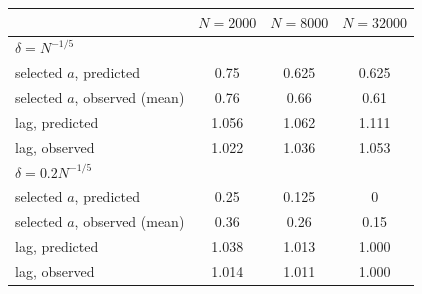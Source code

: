 \begin{tabular}{lccc}
\toprule
 & $N=2000$ & $N=8000$ & $N=32000$ \\
\midrule
\multicolumn{4}{l}{\emph{$\delta=N^{-1/5}$}} \\
selected $a$, predicted & 0.75 & 0.625 & 0.625 \\
selected $a$, observed (mean) & 0.76 & 0.66 & 0.61 \\
lag, predicted & 1.056 & 1.062 & 1.111 \\
lag, observed & 1.022 & 1.036 & 1.053 \\
\multicolumn{4}{l}{\emph{$\delta=0.2N^{-1/5}$}} \\
selected $a$, predicted & 0.25 & 0.125 & 0 \\
selected $a$, observed (mean) & 0.36 & 0.26 & 0.15 \\
lag, predicted & 1.038 & 1.013 & 1.000 \\
lag, observed & 1.014 & 1.011 & 1.000 \\
\bottomrule
\end{tabular}
